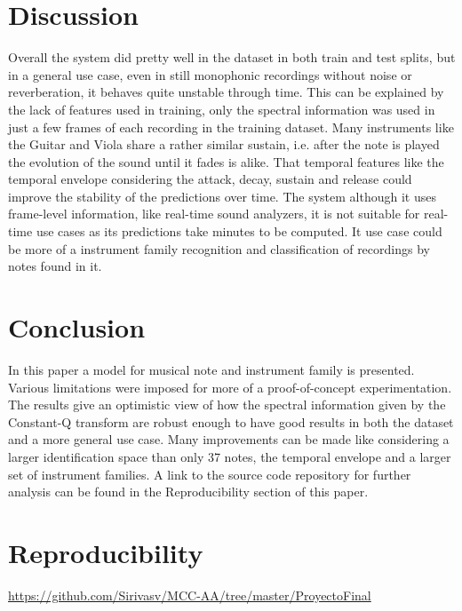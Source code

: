 \documentclass{article}
\begin{document}
\section{Discussion}\label{sec:discussion}
Overall the system did pretty well in the dataset in both train and test splits, but in a general use case, even in still monophonic recordings without noise or reverberation, it behaves quite unstable through time. This can be explained by the lack of features used in training, only the spectral information was used in just a few frames of each recording in the training dataset. Many instruments like the Guitar and Viola share a rather similar sustain, i.e. after the note is played the evolution of the sound until it fades is alike.
That temporal features like the temporal envelope considering the attack, decay, sustain and release could improve the stability of the predictions over time.
The system although it uses frame-level information, like real-time sound analyzers, it is not suitable for real-time use cases as its predictions take minutes to be computed. It use case could be more of a instrument family recognition and classification of recordings by notes found in it.

\section{Conclusion}
In this paper a model for musical note and instrument family is presented. Various limitations were imposed for more of a proof-of-concept experimentation. The results give an optimistic view of how the spectral information given by the Constant-Q transform are robust enough to have good results in both the dataset and a more general use case. Many improvements can be made like considering a larger identification space than only 37 notes, the temporal envelope and a larger set of instrument families. A link to the source code repository for further analysis can be found in the Reproducibility section of this paper.


\section*{Reproducibility}
\url{https://github.com/Sirivasv/MCC-AA/tree/master/ProyectoFinal}

\end{document}
